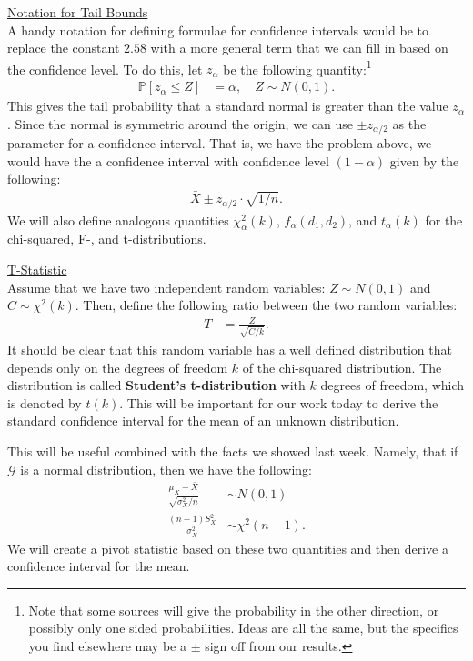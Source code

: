 \documentclass{tufte-handout}
\newcommand{\Prob}{\mathbb{P}}
\begin{document}
\newpage

\noindent
\underline{Notation for Tail Bounds} \\
A handy notation for defining formulae for confidence intervals would be to
replace the constant $2.58$ with a more general term that we can fill in based
on the confidence level. To do this, let $z_{\alpha}$ be the following
quantity:\footnote{
  Note that some sources will give the probability in the other direction,
  or possibly only one sided probabilities. Ideas are all the same, but the
  specifics you find elsewhere may be a $\pm$ sign off from our results.
}
\begin{align*}
\Prob[z_{\alpha} \leq Z ] &= \alpha, \quad Z \sim N(0, 1).
\end{align*}
This gives the tail probability that a standard normal is greater than the value
$z_{\alpha}$. Since the normal is symmetric around the origin, we can use 
$\pm z_{\alpha/2}$ as the parameter for a confidence interval. That is, we 
have the problem above, we would have the a confidence interval with 
confidence level $(1-\alpha)$ given by the following:
\begin{align*}
\bar{X} \pm z_{\alpha/2} \cdot \sqrt{1/n}.
\end{align*}
We will also define analogous quantities $\chi_\alpha^2(k)$, $f_\alpha(d_1, d_2)$,
and $t_\alpha(k)$ for the chi-squared, F-, and t-distributions.

\vspace*{20pt}

\noindent
\underline{T-Statistic} \\
Assume that we have two independent random variables: $Z \sim N(0, 1)$ and
$C \sim \chi^2(k)$. Then, define the following ratio between the two random
variables:
\begin{align*}
T &= \frac{Z}{\sqrt{C / k}}.
\end{align*} 
It should be clear that this random variable has a well defined distribution that
depends only on the degrees of freedom $k$ of the chi-squared distribution. The
distribution is called \textbf{Student's t-distribution} with $k$ degrees of freedom,
which is denoted by $t(k)$. This will be important for our work today to derive the
standard confidence interval for the mean of an unknown distribution.

This will be useful combined with the facts we showed last week. Namely,
that  if $\mathcal{G}$ is a normal distribution, then we have the following:
\begin{align*}
\frac{\mu_X - \bar{X}}{\sqrt{\sigma_X^2 / n}}  &\sim N(0, 1) \\
\frac{(n-1)S^2_X}{\sigma_X^2} &\sim \chi^2(n-1).
\end{align*}
We will create a pivot statistic based on these two quantities and then derive
a confidence interval for the mean.
\end{document}
